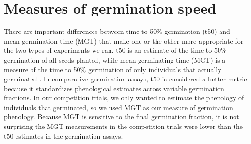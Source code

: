 \documentclass{article}[11pt]
\begin{document}
\section*{Measures of germination speed}
There are important differences between time to 50\% germination (t50) and mean germination time (MGT) that make one or the other more appropriate for the two types of experiments we ran. t50 is an estimate of the time to 50\% germination of all seeds planted, while mean germinating time (MGT) is a measure of the time to 50\% germination of only individuals that actually germinated \citep{Soltani:2015aa}. In comparative germination assays, t50 is considered a better metric because it standardizes phenological estimates across variable germination fractions. In our competition trials, we only wanted to estimate the phenology of individuals that germinated, so we used MGT as our measure of germination phenology. Because MGT is sensitive to the final germination fraction, it is not surprising the MGT measurements in the competition trials  were lower than the t50 estimates in the germination assays.


\end{document}
